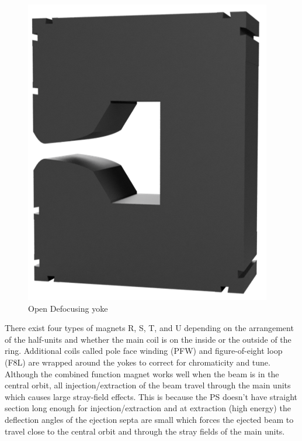 \documentclass[a4paper,
               biblatex,     %
               keeplastbox,   %
               ]{jacow}
\begin{document}
\begin{figure}[!htb]
\begin{minipage}[b]{0.45\columnwidth}
    \includegraphics*[width=\textwidth]{defocusing}
    \caption{Open Defocusing yoke}
    \label{fig:defocusing}
  \end{minipage}
\end{figure}

There exist four types of magnets R, S, T, and U depending on the arrangement of the half-units and whether the main coil is on the inside or the outside of the ring. Additional coils called pole face winding (PFW) and figure-of-eight loop (F8L) are wrapped around the yokes to correct for chromaticity and tune. Although the combined function magnet works well when the beam is in the central orbit, all injection/extraction of the beam travel through the main units which causes large stray-field effects. This is because the PS doesn't have straight section long enough for injection/extraction and at extraction (high energy) the deflection angles of the ejection septa are small which forces the ejected beam to travel close to the central orbit and through the stray fields of the main units. \cite{risselada_beam_nodate}
\end{document}
